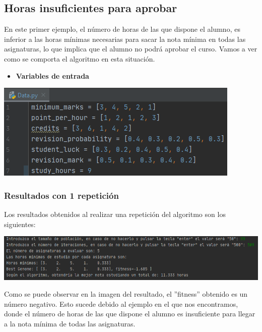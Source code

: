 \documentclass[11pt, a4paper, titlepage]{article}
\begin{document}
\subsection{Horas insuficientes para aprobar}
En este primer ejemplo, el número de horas de las que dispone el alumno, es inferior a las horas mínimas necesarias para sacar la nota mínima en todas las asignaturas, lo que implica que el alumno no podrá aprobar el curso. Vamos a ver como se comporta el algoritmo en esta situación.

\vspace{5mm}

\begin{itemize}
\item \textbf{Variables de entrada}
\end{itemize}
\includegraphics[scale=1]{img/Data_horas_insuficientes.png}

\subsubsection{Resultados con 1 repetición}
Los resultados obtenidos al realizar una repetición del algoritmo son los siguientes:

\vspace{5mm}

\includegraphics[scale=0.7]{img/Res1_horas_insuf.png}

\vspace{5mm}

Como se puede observar en la imagen del resultado, el ''fitness'' obtenido es un número negativo. Esto sucede debido al ejemplo en el que nos encontramos, donde el número de horas de las que dispone el alumno es insuficiente para llegar a la nota mínima de todas las asignaturas.

\vspace{5mm}
\end{document}
